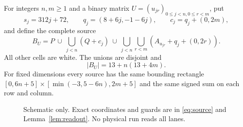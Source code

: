 \documentclass[11pt]{article}
\theoremstyle{definition}\newtheorem{definition}[theorem]{Definition}
\begin{document}
For integers $n,m\ge1$ and a binary matrix $U=(u_{jr})_{0\le j<n,0\le r<m}$,
put
\[
s_j=312j+72,\qquad q_j=(8+6j,-1-6j),\qquad c_j=q_j+(0,2m),
\]
and define the complete source
\begin{equation}\label{eq:source}
B_U=P\ \cup\ \bigcup_{j<n}(Q+c_j)
\ \cup\ \bigcup_{j<n}\bigcup_{r<m}(A_{u_{jr}}+q_j+(0,2r)).
\end{equation}
All other cells are white. The unions are disjoint and
\begin{equation}\label{eq:mass}
|B_U|=13+n(13+4m).
\end{equation}
For fixed dimensions every source has the same bounding rectangle
$[0,6n+5]\times[\min(-3,5-6n),2m+5]$ and the same signed sum on each row and column.

\begin{figure}[t]
\centering
{}
\caption{Schematic only. Exact coordinates and guards are in
\eqref{eq:source} and Lemma~\ref{lem:readout}. No physical run reads all lanes.}
\end{figure}
\end{document}
